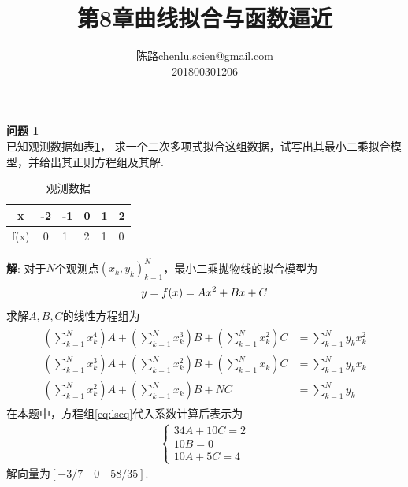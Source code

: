 \documentclass[UTF8]{ctexart}
\makeatletter
\newenvironment{problem}[2][问题]
{\begin{mdframed}[backgroundcolor=gray!20] \textbf{#1 #2} \\}
	{\end{mdframed}}
\newcommand\assignmentNumber{8}
\newcommand\studentName{陈路}
\newcommand\studentEmail{chenlu.scien@gmail.com}
\newcommand\studentNumber{201800301206}
\makeatother
\begin{document}
    
    \title{第\assignmentNumber 章\quad 曲线拟合与函数逼近}
    
    \author{\name \studentName \email \studentEmail \\
    \studentNumber
    }
    
    \maketitle

\begin{problem}{1}
已知观测数据如表\ref{t0}，
求一个二次多项式拟合这组数据，试写出其最小二乘拟合模型，并给出其正则方程组及其解.	
\end{problem}
\begin{table}[htbp]
	\centering
	\caption{观测数据}
	\label{t0}
	\begin{tabular}{ccllll}
		\hline
		x    & -2 & -1 & 0 & 1 & 2 \\ \hline
		f(x) & 0  & 1  & 2 & 1 & 0 \\ \hline
	\end{tabular}
\end{table}
\textbf{解}:
对于$N$个观测点${(x_{k},y_{k})}^{N}_{k=1}$，最小二乘抛物线的拟合模型为
\begin{align}
	y = f(x) = Ax^{2} + Bx + C \notag
\end{align}
求解$A, B, C$的线性方程组为
\begin{align}
	\begin{aligned}
	\left(\sum_{k=1}^{N} x_{k}^{4}\right) A+\left(\sum_{k=1}^{N} x_{k}^{3}\right) B+\left(\sum_{k=1}^{N} x_{k}^{2}\right) C &=\sum_{k=1}^{N} y_{k} x_{k}^{2} \\
	\left(\sum_{k=1}^{N} x_{k}^{3}\right) A+\left(\sum_{k=1}^{N} x_{k}^{2}\right) B+\left(\sum_{k=1}^{N} x_{k}\right) C &=\sum_{k=1}^{N} y_{k} x_{k} \\
	\left(\sum_{k=1}^{N} x_{k}^{2}\right) A+\left(\sum_{k=1}^{N} x_{k}\right) B+N C &=\sum_{k=1}^{N} y_{k} \label{eq:lseq}
	\end{aligned}
\end{align}
在本题中，方程组\ref{eq:lseq}代入系数计算后表示为
\begin{align}
	\begin{cases}
		34A + 10C = 2\\
		10B = 0\\
		10A + 5C = 4
	\end{cases}
\end{align}
解向量为$[-3/7\quad 0\quad 58/35]$.\\
\end{document}
